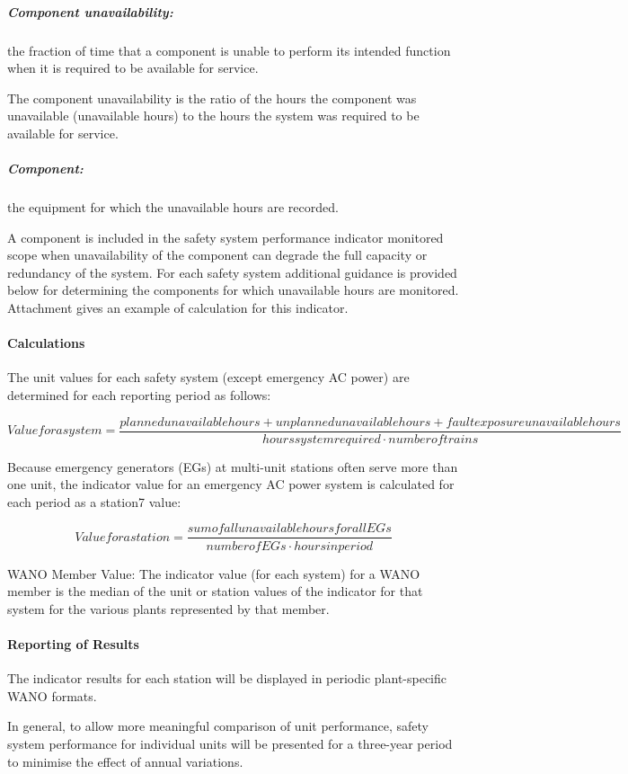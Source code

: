 \subparagraph {Component unavailability:} the fraction of time that a
component is unable to perform its intended function when it is
required to be available for service.

The component unavailability is the ratio of the hours the component
was unavailable (unavailable hours) to the hours the system was
required to be available for service.

\subparagraph {Component:} the equipment for which the unavailable
hours are recorded.

A component is included in the safety system performance indicator
monitored scope when unavailability of the component can degrade the
full capacity or redundancy of the system. For each safety system
additional guidance is provided below for determining the components
for which unavailable hours are monitored. Attachment gives an example
of calculation for this indicator.


\paragraph{Calculations}

The unit values for each safety system (except emergency AC power) are
determined for each reporting period as follows:

$$ Value for a system = \frac {planned unavailable hours+unplanned unavailable hours+fault
exposure unavailable hours}{hours system required\cdot number of
trains} $$

Because emergency generators (EGs) at multi-unit stations often serve
more than one unit, the indicator value for an emergency AC power
system is calculated for each period as a station7 value:

$$ Value for a station = \frac{sum of all unavailable hours for all
EGs}{number of EGs \cdot hours in period} $$

WANO Member Value: The indicator value (for each system) for a WANO
member is the median of the unit or station values of the indicator
for that system for the various plants represented by that member.

\paragraph{Reporting of Results}

The indicator results for each station will be displayed in periodic
plant-specific WANO formats.

In general, to allow more meaningful comparison of unit performance,
safety system performance for individual units will be presented for a
three-year period to minimise the effect of annual variations.

